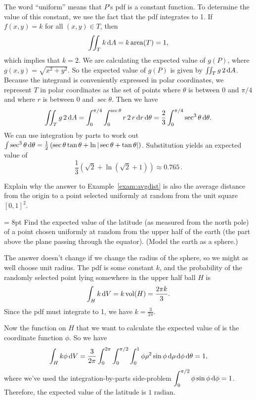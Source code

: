\documentclass[prettycode,shellescape]{watsonbook}
\begin{document}
\begin{solution}
  The word ``uniform'' means that $P$'s pdf is a constant function. To
  determine the value of this constant, we use the fact that the pdf
  integrates to 1. If $f(x,y) = k$ for all $(x,y) \in T$, then
  \[
    \iint_T k \, \mathrm{d} A = k\, \mathrm{area}(T) = 1, 
  \]
  which implies that $k=2$. We are calculating the expected
  value of $g(P)$, where $g(x,y) = \sqrt{x^2 + y^2}$. So the expected
  value of $g(P)$ is given by $\iint_T g \, 2\,\mathrm{d} A$. Because the
  integrand is conveniently expressed in polar coordinates, we
  represent $T$ in polar coordinates as the set of points where
  $\theta$ is between $0$ and $\pi/4$ and where $r$ is between 0
  and $\sec \theta$. Then we have
  \[
    \iint_T g \, 2\, \mathrm{d} A = \int_{0}^{\pi/4} \int_0^{\sec \theta} r
    \, 2\, r \, \mathrm{d} r\, \mathrm{d}\theta = \frac{2}{3} \int_{0}^{\pi/4} \sec^3
    \theta \, \mathrm{d}\theta. 
  \]
  We can use integration by parts to work out
  $\int \sec^3 \theta \, \mathrm{d} \theta = \frac{1}{2}\left(\sec \theta \tan
    \theta + \ln|\sec\theta + \tan \theta|\right)$.
  Substitution yields an expected value of
  \[
    \boxed{\frac{1}{3}\left(\sqrt{2} +
        \ln\left({\sqrt{2}+1}\right)\right) \approx
      0.765}\,.
  \]
\end{solution}

\begin{exercise}{}{}
  Explain why the answer to Example~\ref{exam:avgdist} is also the
  average distance from the origin to a point selected uniformly at
  random from the unit square $[0,1]^2$. 
\end{exercise}

\begin{example}{}{} \parskip = 8pt Find the expected value of the
  latitude (as measured from the north pole) of a point chosen
  uniformly at random from the upper half of the earth (the part above
  the plane passing through the equator). (Model the earth as a
  sphere.)
\end{example}

\begin{solution}
  The answer doesn't change if we change the radius of the sphere, so
  we might as well choose unit radius. The pdf is some constant $k$,
  and the probability of the randomly selected point lying somewhere
  in the upper half ball $H$ is
  \[
    \int_H k \, \mathrm{d} V = k\, \mathrm{vol}(H) = \frac{2\pi k}{3}. 
  \]
  Since the pdf must integrate to 1, we have $k =
  \tfrac{3}{2\pi}$.

  Now the function on $H$ that we want to calculate the expected value
  of is the coordinate function $\phi$. So we have
  \[
    \int_H k\phi \, \mathrm{d} V = \frac{3}{2\pi} \int_0^{2\pi} \int
    _0^{\pi/2}\int_{0}^{1} \phi \rho^2 \sin \phi \, \mathrm{d} \rho \, \mathrm{d} \phi
    \, \mathrm{d} \theta = 1, 
  \]
  where we've used the integration-by-parts side-problem
  $\displaystyle{\int_0^{\pi/2} \phi \sin \phi \, \mathrm{d}\phi =
    1}$. Therefore, the expected value of the latitude is
  $\boxed{1 \text{ radian}}$.
\end{solution}
\end{document}
